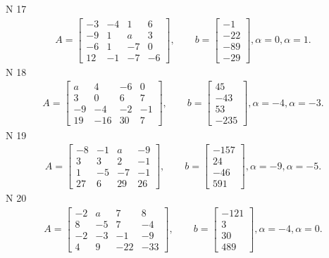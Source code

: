 \documentclass[11pt]{report}
\begin{document}
N 17
\begin{align*}
 A = \left[\begin{matrix}-3 & -4 & 1 & 6\\-9 & 1 & a & 3\\-6 & 1 & -7 & 0\\12 & -1 & -7 & -6\end{matrix}\right],
    \qquad b = \left[\begin{matrix}-1\\-22\\-89\\-29\end{matrix}\right], \alpha = 0, \alpha = 1. 
 \end{align*}
N 18
\begin{align*}
 A = \left[\begin{matrix}a & 4 & -6 & 0\\3 & 0 & 6 & 7\\-9 & -4 & -2 & -1\\19 & -16 & 30 & 7\end{matrix}\right],
    \qquad b = \left[\begin{matrix}45\\-43\\53\\-235\end{matrix}\right], \alpha = -4, \alpha = -3. 
 \end{align*}
N 19
\begin{align*}
 A = \left[\begin{matrix}-8 & -1 & a & -9\\3 & 3 & 2 & -1\\1 & -5 & -7 & -1\\27 & 6 & 29 & 26\end{matrix}\right],
    \qquad b = \left[\begin{matrix}-157\\24\\-46\\591\end{matrix}\right], \alpha = -9, \alpha = -5. 
 \end{align*}
N 20
\begin{align*}
 A = \left[\begin{matrix}-2 & a & 7 & 8\\8 & -5 & 7 & -4\\-2 & -3 & -1 & -9\\4 & 9 & -22 & -33\end{matrix}\right],
    \qquad b = \left[\begin{matrix}-121\\3\\30\\489\end{matrix}\right], \alpha = -4, \alpha = 0. 
 \end{align*}
\end{document}
